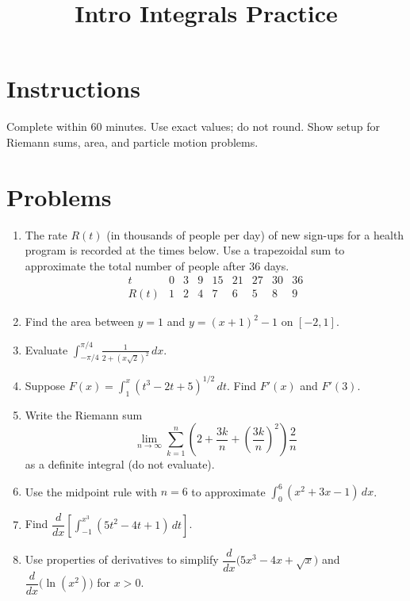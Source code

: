 \documentclass[12pt]{article}
\title{Intro Integrals Practice}
\author{}
\date{}
\begin{document}
\maketitle

\section*{Instructions}
Complete within 60 minutes. Use exact values; do not round. Show setup for Riemann sums, area, and particle motion problems.

\section*{Problems}
\begin{enumerate}[leftmargin=*, itemsep=1.0em, topsep=0.8em]
  \item The rate $R(t)$ (in thousands of people per day) of new sign-ups for a health program is recorded at the times below. Use a trapezoidal sum to approximate the total number of people after 36 days.
  \[
  \begin{array}{c|ccccccccc}
  t & 0 & 3 & 9 & 15 & 21 & 27 & 30 & 36\\ \hline
  R(t) & 1 & 2 & 4 & 7 & 6 & 5 & 8 & 9
  \end{array}
  \]

  \item Find the area between $y=1$ and $y=(x+1)^2-1$ on $[-2,1]$.

  \item Evaluate $\displaystyle \int_{-\pi/4}^{\pi/4} \frac{1}{2+\left(x\sqrt{2}\right)^2}\,dx$.

  \item Suppose $F(x)=\int_{1}^{x}(t^3-2t+5)^{1/2}\,dt$. Find $F'(x)$ and $F'(3)$.

  \item Write the Riemann sum
  \[
  \lim_{n\to\infty}\sum_{k=1}^n \left(2+\frac{3k}{n}+\left(\frac{3k}{n}\right)^2\right)\frac{2}{n}
  \]
  as a definite integral (do not evaluate).

  \item Use the midpoint rule with $n=6$ to approximate $\displaystyle \int_{0}^{6} (x^2+3x-1)\,dx$.

  \item Find $\dfrac{d}{dx}\left[\int_{-1}^{x^3}(5t^2-4t+1)\,dt\right]$.

  \item Use properties of derivatives to simplify $\dfrac{d}{dx}\big(5x^3-4x+\sqrt{x}\big)$ and $\dfrac{d}{dx}\big(\ln(x^2)\big)$ for $x>0$.


\end{enumerate}
\end{document}
